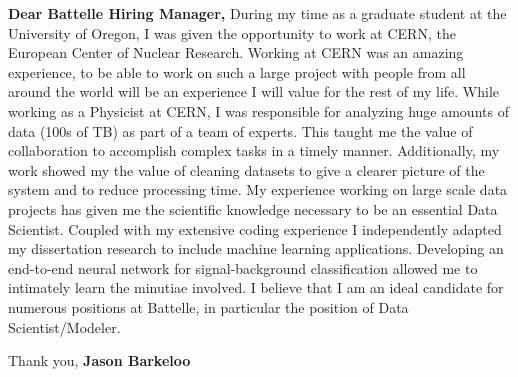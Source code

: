 \documentclass[a4paper]{article}
\title{}
\author{Jason T. Barkeloo}
\date{\today}
\begin{document}
\setlength{\parindent}{0cm}

\fontsize{12}{15}
\selectfont
\maketitle


\textbf{Dear Battelle Hiring Manager,}\newline\newline
\newline\newline
During my time as a graduate student at the University of Oregon, I was given the opportunity to work at CERN, the European Center of Nuclear Research. Working at CERN was an amazing experience, to be able to work on such a large project with people from all around the world will be an experience I will value for the rest of my life.\newline\newline
While working as a Physicist at CERN, I was responsible for analyzing huge amounts of data (100s of TB) as part of a team of experts. This taught me the value of collaboration to accomplish complex tasks in a timely manner. Additionally, my work showed my the value of cleaning datasets to give a clearer picture of the system and to reduce processing time.\newline\newline
My experience working on large scale data projects has given me the scientific knowledge necessary to be an essential Data Scientist. Coupled with my extensive coding experience I independently adapted my dissertation research to include machine learning applications.  Developing an end-to-end neural network for signal-background classification allowed me to intimately learn the minutiae involved.  I believe that I am an ideal candidate for numerous positions at Battelle, in particular the position of Data Scientist/Modeler.\newline\newline

Thank you,
\newline \newline
\textbf{Jason Barkeloo}
\end{document}
